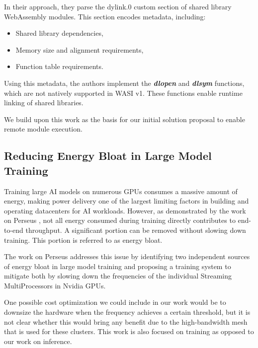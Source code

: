 In their approach, they parse the dylink.0 custom section of shared library WebAssembly modules.
This section encodes metadata, including:

\begin{itemize}
\item Shared library dependencies,
\item Memory size and alignment requirements,
\item Function table requirements.
\end{itemize}

Using this metadata, the authors implement the \textit{\textbf{dlopen}} and \textit{\textbf{dlsym}} functions, which are not natively supported in WASI v1. These functions enable runtime linking of shared libraries.

We build upon this work as the basis for our initial solution proposal to enable remote module execution.



\subsection {Reducing Energy Bloat in Large Model Training
}

Training large AI models on numerous GPUs consumes a massive amount of energy, making power delivery one of the largest limiting factors in building and operating datacenters for AI workloads. However, as demonstrated by the work on Perseus \cite{chung2024reducing}, not all energy consumed during training directly contributes to end-to-end throughput. A significant portion can be removed without slowing down training. This portion is referred to as energy bloat.

The work on Perseus addresses this issue by identifying two independent sources of energy bloat in large model training and proposing a training system to mitigate both by slowing down the frequencies of the individual Streaming MultiProcessors in Nvidia GPUs.

One possible cost optimization we could include in our work would be to downsize the hardware when the frequency achieves a certain threshold, but it is not clear whether this would bring any benefit due to the high-bandwidth mesh that is used for these clusters. This work is also focused on training as opposed to our work on inference.

